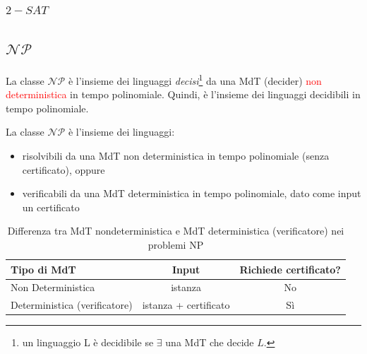 \documentclass{article}  %
\theoremstyle{definition}
\begin{document}
\subsubsection{$2-SAT$}
\break
\subsection{$\mathcal{NP}$}
La classe $\mathcal{NP}$ è l'insieme dei linguaggi \textit{decisi}\footnote{un linguaggio
	L è decidibile se $\exists$ una MdT che decide $L$.} da una MdT (decider) \textcolor{red}{non deterministica} in tempo polinomiale.
Quindi, è l'insieme dei linguaggi decidibili in tempo polinomiale.
\begin{osservazioni}[Osservazione]
	\footnotesize
	La classe $\mathcal{NP}$ è l'insieme dei linguaggi:
	\begin{itemize}
		\item risolvibili da una MdT non deterministica in tempo polinomiale (senza certificato), oppure
		\item verificabili da una MdT deterministica in tempo polinomiale, dato come input un certificato
	\end{itemize}
\end{osservazioni}
\begin{table}[h!]
	\centering
	\footnotesize
	\begin{tabular}{|l|c|c|}
		\hline
		\rowcolor{gray!30}
		\textbf{Tipo di MdT}                                & \textbf{Input}        & \textbf{Richiede certificato?} \\
		\hline
		\cellcolor{blue!15} Non Deterministica              & istanza               & No                             \\
		\hline
		\cellcolor{yellow!15} Deterministica (verificatore) & istanza + certificato & Sì                             \\
		\hline
	\end{tabular}
	\caption{Differenza tra MdT nondeterministica e MdT deterministica (verificatore) nei problemi NP}
\end{table}
\end{document}

